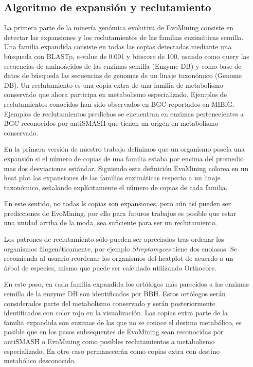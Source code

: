 \documentclass[12pt,twoside]{reedthesis}
\begin{document}
  \subsection{Algoritmo de expansión y
  reclutamiento}\label{algoritmo-de-expansion-y-reclutamiento}
  
  La primera parte de la minería genómica evolutiva de EvoMining consiste
  en detectar las expansiones y los reclutamientos de las familias
  enzimáticas semilla. Una familia expandida consiste en todas las copias
  detectadas mediante una búsqueda con BLASTp, e-value de 0.001 y bitscore
  de 100, usando como query las secuencias de aminoácidos de las enzimas
  semilla (Enzyme DB) y como base de datos de búsqueda las secuencias de
  genomas de un linaje taxonómico (Genome DB). Un reclutamiento es una
  copia extra de una familia de metabolismo conservado que ahora participa
  en metabolismo especializado. Ejemplos de reclutamientos conocidos han
  sido observados en BGC reportados en MIBiG. Ejemplos de reclutamientos
  predichos se encuentran en enzimas pertenecientes a BGC reconocidos por
  antiSMASH que tienen un origen en metabolismo conservado.
  
  En la primera versión de nuestro trabajo definimos que un organismo
  poseía una expansión si el número de copias de una familia estaba por
  encima del promedio mas dos desviaciones estándar. Siguiendo esta
  definición EvoMining colorea en un heat plot las expansiones de las
  familias enzimáticas respecto a un linaje taxonómico, señalando
  explícitamente el número de copias de cada familia.
  
  En este sentido, no todas ls copias son expansiones, pero aún así pueden
  ser predicciones de EvoMining, por ello para futuros trabajos es posible
  que estar una unidad arriba de la moda, sea suficiente para ser un
  reclutamiento.
  
  Los patrones de reclutamiento sólo pueden ser apreciados tras ordenar
  los organismos filogenéticamente, por ejemplo \emph{Streptomyces} tiene
  dos enolasas. Se recomienda al usuario reordenar los organismos del
  heatplot de acuerdo a un árbol de especies, mismo que puede ser
  calculado utilizando Orthocore.
  
  En este paso, en cada familia expandida los ortólogos más parecidos a
  las enzimas semilla de la enzyme DB son identificados por BBH. Estos
  ortólogos serán considerados parte del metabolismo conservado y serán
  posteriormente identificados con color rojo en la visualización. Las
  copias extra parte de la familia expandida son enzimas de las que no se
  conoce el destino metabólico, es posible que en los pasos subsequentes
  de EvoMining sean reconocidas por antiSMASH o EvoMining como posibles
  reclutamientos a metabolismo especializado. En otro caso permanecerán
  como copias extra con destino metabólico desconocido.
  
\end{document}
